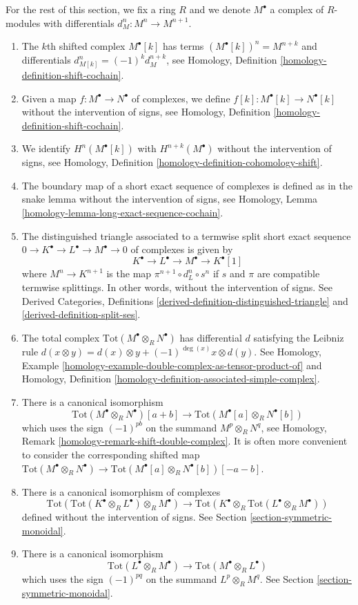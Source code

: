 \medskip\noindent
For the rest of this section, we fix a ring $R$ and we denote
$M^\bullet$ a complex of $R$-modules with differentials
$d^n_M : M^n \to M^{n + 1}$.
\begin{enumerate}
\item The $k$th shifted complex $M^\bullet[k]$ has terms
$(M^\bullet[k])^n = M^{n + k}$ and differentials
$d_{M[k]}^n = (-1)^kd^{n + k}_M$, see
Homology, Definition \ref{homology-definition-shift-cochain}.
\item Given a map $f : M^\bullet \to N^\bullet$ of complexes, we define
$f[k] : M^\bullet[k] \to N^\bullet[k]$ without the intervention of signs, see
Homology, Definition \ref{homology-definition-shift-cochain}.
\item We identify $H^n(M^\bullet[k])$ with $H^{n + k}(M^\bullet)$
without the intervention of signs, see
Homology, Definition \ref{homology-definition-cohomology-shift}.
\item The boundary map of a short exact sequence of complexes
is defined as in the snake lemma without the intervention of signs, see
Homology, Lemma \ref{homology-lemma-long-exact-sequence-cochain}.
\item The distinguished triangle associated to a termwise split
short exact sequence $0 \to K^\bullet \to L^\bullet \to M^\bullet \to 0$
of complexes is given by
$$
K^\bullet \to L^\bullet \to M^\bullet \to K^\bullet[1]
$$
where $M^n \to K^{n + 1}$ is the map $\pi^{n + 1} \circ d^n_L \circ s^n$
if $s$ and $\pi$ are compatible termwise splittings. In other words,
without the intervention of signs. See
Derived Categories, Definitions \ref{derived-definition-distinguished-triangle}
and \ref{derived-definition-split-ses}.
\item The total complex $\text{Tot}(M^\bullet \otimes_R N^\bullet)$
has differential $d$ satisfying the Leibniz rule
$d(x \otimes y) = d(x) \otimes y + (-1)^{\deg(x)}x \otimes d(y)$.
See Homology, Example
\ref{homology-example-double-complex-as-tensor-product-of} and
Homology, Definition \ref{homology-definition-associated-simple-complex}.
\item
\label{item-shift-tensor}
There is a canonical isomorphism
$$
\text{Tot}(M^\bullet \otimes_R N^\bullet)[a + b] \to
\text{Tot}(M^\bullet[a] \otimes_R N^\bullet[b])
$$
which uses the sign $(-1)^{pb}$ on the summand $M^p \otimes_R N^q$,
see Homology, Remark \ref{homology-remark-shift-double-complex}. It
is often more convenient to consider the corresponding shifted map
$\text{Tot}(M^\bullet \otimes_R N^\bullet) \to
\text{Tot}(M^\bullet[a] \otimes_R N^\bullet[b])[-a - b]$.
\item There is a canonical isomorphism of complexes
$$
\text{Tot}(
\text{Tot}(K^\bullet \otimes_R L^\bullet) \otimes_R M^\bullet) \to
\text{Tot}(K^\bullet \otimes_R \text{Tot}(L^\bullet \otimes_R M^\bullet))
$$
defined without the intervention of signs. See
Section \ref{section-symmetric-monoidal}.
\item
\label{item-flip-tensor-product}
There is a canonical isomorphism
$$
\text{Tot}(L^\bullet \otimes_R M^\bullet) \to
\text{Tot}(M^\bullet \otimes_R L^\bullet)
$$
which uses the sign $(-1)^{pq}$ on the summand $L^p \otimes_R M^q$.
See Section \ref{section-symmetric-monoidal}.
\end{enumerate}
